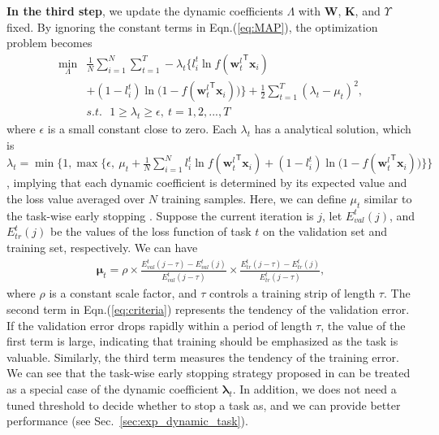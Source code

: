 \documentclass[10pt,journal,compsoc]{IEEEtran}
\newcommand{\x} {\textbf{x}}
\newcommand{\w} {\textbf{w}}
\newcommand{\W} {\textbf{W}}
\newcommand{\K} {\textbf{K}}
\newcommand{\trans}[1]{{#1}^{\ensuremath{\mathsf{T}}}}
\begin{document}
\vspace{0.1cm}
\textbf{In the third step}, we update the dynamic coefficients $\Lambda$ with $\W$, $\K$, and $\Upsilon$ fixed. By ignoring the constant terms in Eqn.(\ref{eq:MAP}), the optimization problem becomes
\begin{equation}\label{eq:Lambda}
\begin{split}
\min_{\Lambda}&\frac{1}{N}\sum_{i=1}^N\sum_{t=1}^T-\lambda_t\{ l^t_i\ln f(\trans{\w^l_t}\x_i)\\
&+(1-l^t_i)\ln\big(1-f(\trans{\w^l_t}\x_i)\big)\}+\frac{1}{2}\sum_{t=1}^T(\lambda_t-\mu_t)^2,\\
&s.t.~~~1\geq\lambda_t\geq\epsilon,~t=1,2,...,T
\end{split}
\end{equation}
where $\epsilon$ is a small constant close to zero. Each $\lambda_t$ has a analytical solution, which is $\lambda_t=\min\big\{1,\max\big\{\epsilon,~\mu_t+\frac{1}{N}\sum_{i=1}^Nl^t_i\ln f(\trans{\w^l_t}\x_i)+(1-l^t_i)\ln\big(1-f(\trans{\w^l_t}\x_i)\big)\big\}\big\}$, implying that each dynamic coefficient is determined by its expected value and the loss value averaged over $N$ training samples. Here, we can define $\mu_t$ similar to the task-wise early stopping \cite{zhang2014facial}. Suppose the current iteration is $j$, let $E_{val}^t(j)$, and $E_{tr}^t(j)$ be the values of the loss function of task $t$ on the validation set and training set, respectively. We can have
\begin{equation}\label{eq:criteria}
\begin{split}
\mathbf{\mu}_{t} = \rho\times\frac{E^{t}_{val}(j-\tau)-E^{t}_{val}(j)}{E^{t}_{val}(j-\tau)}\times
\frac{E^{t}_{tr}(j-\tau)-E^{t}_{tr}(j)}{E^{t}_{tr}(j-\tau)},
\end{split}
\end{equation}
where $\rho$ is a constant scale factor, and $\tau$ controls a training strip of length $\tau$. The second term in Eqn.(\ref{eq:criteria}) represents the tendency of the validation error. If the validation error drops rapidly within a period of length $\tau$, the value of the first term is large, indicating that training should be emphasized as the task is valuable. Similarly, the third term measures the tendency of the training error. We can see that the task-wise early stopping strategy proposed in\cite{zhang2014facial} can be treated as a special case of the dynamic coefficient $\mathbf{\lambda}_{t}$. In addition, we does not need a tuned threshold to decide whether to stop a task as\cite{zhang2014facial}, and we can provide better performance (see Sec.~\ref{sec:exp_dynamic_task}).
\end{document}
